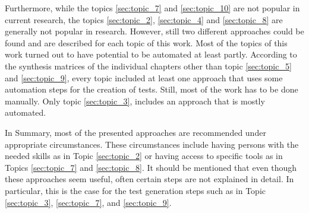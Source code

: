 Furthermore, while the topics \ref{sec:topic_7} and \ref{sec:topic_10} are not popular in current research, the topics \ref{sec:topic_2}, \ref{sec:topic_4} and \ref{sec:topic_8} are generally not popular in research. However, still two different approaches could be found and are described for each topic of this work. Most of the topics of this work turned out to have potential to be automated at least partly. According to the synthesis matrices of the individual chapters other than topic \ref{sec:topic_5} and \ref{sec:topic_9}, every topic included at least one approach that uses some automation steps for the creation of tests. Still, most of the work has to be done manually. Only topic \ref{sec:topic_3},  includes an approach that is mostly automated.

In Summary, most of the presented approaches are recommended under appropriate circumstances. These circumstances include having persons with the needed skills as in Topic \ref{sec:topic_2} or having access to specific tools as in Topics \ref{sec:topic_7} and \ref{sec:topic_8}. It should be mentioned that even though these approaches seem useful, often certain steps are not explained in detail. In particular, this is the case for the test generation steps such as in Topic \ref{sec:topic_3}, \ref{sec:topic_7}, and \ref{sec:topic_9}. 
